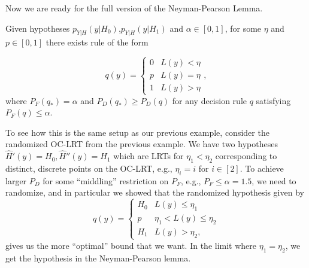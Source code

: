 Now we are ready for the full version of the Neyman-Pearson Lemma. 
\begin{theorem}

Given hypotheses $p_{Y|H}(y|H_0)$,$p_{Y|H}(y|H_1)$ and $\alpha\in [0,1]$, for some $\eta$ and $p\in [0,1]$ there exists rule of the form 

\[
q(y) = \begin{cases}
	0 & L(y) < \eta \\
	p & L(y) = \eta \\
	1 & L(y) > \eta
\end{cases},
\] 
where $P_F(q_*) = \alpha$ and $P_D(q_*)\geq P_D(q)$ for any decision rule $q$ satisfying $P_F(q)\leq \alpha$.
\end{theorem}

To see how this is the same setup as our previous example, consider the randomized OC-LRT from the previous example. We have two hypotheses $\hat{H}'(y)=H_0,\hat{H}''(y)=H_1$ which are LRTs for $\eta_1<\eta_2$ corresponding to distinct, discrete points on the OC-LRT, e.g., $\eta_i=i$ for $i\in [2]$. To achieve larger $P_D$ for some ``middling'' restriction on $P_F$, e.g., $P_F\leq \alpha = 1.5$, we need to randomize, and in particular we showed that the randomized hypothesis given by 
\[q(y) = \begin{cases}
	H_0 & L(y) \leq \eta_1 \\
	p & \eta_1 < L(y) \leq \eta_2 \\
	H_1 & L(y) > \eta_2,
\end{cases}\] 
gives us the more ``optimal'' bound that we want. In the limit where $\eta_1=\eta_2$, we get
the hypothesis in the Neyman-Pearson lemma.

